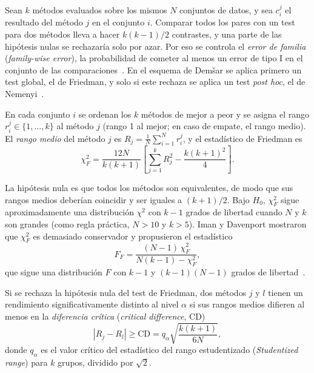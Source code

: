 Sean $k$ métodos evaluados sobre los mismos $N$ conjuntos de datos, y sea $c_i^j$ el resultado del método $j$ en el conjunto $i$. Comparar todos los pares con un test para dos métodos lleva a hacer $k(k-1)/2$ contrastes, y una parte de las hipótesis nulas se rechazaría solo por azar. Por eso se controla el \emph{error de familia} (\emph{family-wise error}), la probabilidad de cometer al menos un error de tipo I en el conjunto de las comparaciones~\cite[sec.~3.2]{demsar2006}. En el esquema de Demšar se aplica primero un test global, el de Friedman, y solo si este rechaza se aplica un test \emph{post hoc}, el de Nemenyi~\cite[sec.~3.2.2]{demsar2006}.

\begin{definicion}\label{def:friedman}
En cada conjunto $i$ se ordenan los $k$ métodos de mejor a peor y se asigna el rango $r_i^j \in \{1, \dots, k\}$ al método $j$ (rango 1 al mejor; en caso de empate, el rango medio). El \emph{rango medio} del método $j$ es $R_j = \frac{1}{N} \sum_{i=1}^{N} r_i^j$, y el estadístico de Friedman es
\[
  \chi^2_F = \frac{12N}{k(k+1)} \left[ \sum_{j=1}^{k} R_j^2 - \frac{k(k+1)^2}{4} \right].
\]
\end{definicion}

La hipótesis nula es que todos los métodos son equivalentes, de modo que sus rangos medios deberían coincidir y ser iguales a $(k+1)/2$. Bajo $H_0$, $\chi^2_F$ sigue aproximadamente una distribución $\chi^2$ con $k - 1$ grados de libertad cuando $N$ y $k$ son grandes (como regla práctica, $N > 10$ y $k > 5$). Iman y Davenport mostraron que $\chi^2_F$ es demasiado conservador y propusieron el estadístico
\[
  F_F = \frac{(N - 1)\, \chi^2_F}{N(k - 1) - \chi^2_F},
\]
que sigue una distribución $F$ con $k - 1$ y $(k - 1)(N - 1)$ grados de libertad~\cite[sec.~3.2.2]{demsar2006}.

\begin{definicion}\label{def:nemenyi}
Si se rechaza la hipótesis nula del test de Friedman, dos métodos $j$ y $l$ tienen un rendimiento significativamente distinto al nivel $\alpha$ si sus rangos medios difieren al menos en la \emph{diferencia crítica} (\emph{critical difference}, CD)
\[
  |R_j - R_l| \ge \mathrm{CD} = q_\alpha \sqrt{\frac{k(k+1)}{6N}},
\]
donde $q_\alpha$ es el valor crítico del estadístico del rango estudentizado (\emph{Studentized range}) para $k$ grupos, dividido por $\sqrt{2}$.
\end{definicion}

